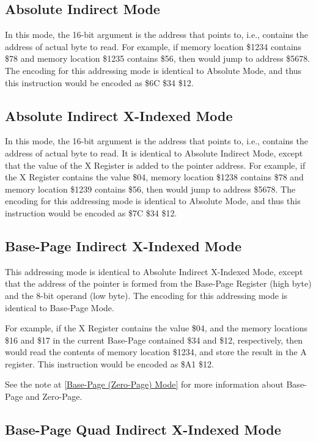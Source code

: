 \subsection{Absolute Indirect Mode}

In this mode, the 16-bit argument is the address that points to, i.e., contains the
address of actual byte to read.  For example, if memory location \$1234 contains \$78
and memory location \$1235 contains \$56, then  would jump
to address \$5678.  The encoding for this addressing mode is identical to Absolute Mode,
 and thus this instruction would be encoded as \$6C \$34 \$12.

\subsection{Absolute Indirect X-Indexed Mode}

In this mode, the 16-bit argument is the address that points to, i.e., contains the
address of actual byte to read. It is identical to Absolute Indirect Mode, except that
 the value of the X Register is added to the pointer address.
For example, if the X Register contains the value \$04, memory location \$1238 contains \$78
and memory location \$1239 contains \$56, then  would jump
to address \$5678.
The encoding for this addressing mode is identical to Absolute Mode, and thus this instruction
would be encoded as \$7C \$34 \$12.

\subsection{Base-Page Indirect X-Indexed Mode}

This addressing mode is identical to Absolute Indirect X-Indexed Mode, except that the address
of the pointer is formed from the Base-Page Register (high byte) and the 8-bit operand (low byte).
The encoding for this addressing mode is identical to Base-Page Mode.

For example, if the X Register contains the value \$04, and the memory locations \$16 and \$17 in the current
Base-Page contained \$34 and \$12, respectively,
then  would read the contents of memory location \$1234,
and store the result in the A register. This instruction would be encoded as \$A1 \$12.

See the note at \ref{Base-Page (Zero-Page) Mode} for more information about Base-Page and Zero-Page.

\subsection{Base-Page Quad Indirect X-Indexed Mode}

